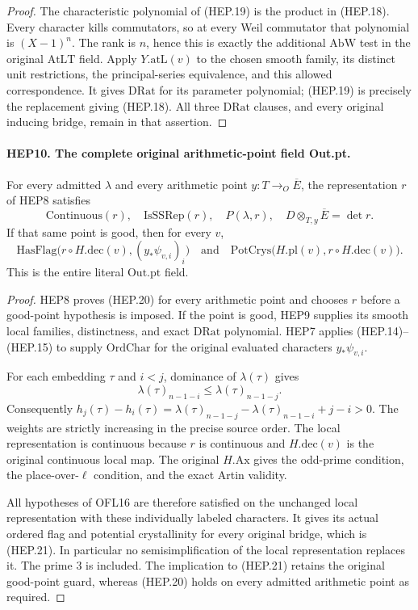 \begin{proof}
The characteristic polynomial of (HEP.19) is the product in
(HEP.18).  Every character kills commutators, so at every Weil
commutator that polynomial is $(X-1)^n$.  The rank is $n$,
hence this is exactly the additional $\mathrm{AbW}$ test in
the original $\mathrm{AtLT}$ field.  Apply $Y.\mathrm{atL}(v)$
to the chosen smooth family, its distinct unit restrictions,
the principal-series equivalence, and this allowed correspondence.
It gives $\mathrm{DRat}$ for its parameter polynomial; (HEP.19)
is precisely the replacement giving (HEP.18).  All three
$\mathrm{DRat}$ clauses, and every original inducing bridge,
remain in that assertion.
\end{proof}

\paragraph{HEP10. The complete original arithmetic-point field Out.pt.}
\label{claim:HEP10}
For every admitted $\lambda$ and every arithmetic point
$y:T\to_O\overline E$, the representation $r$ of HEP8 satisfies
\[
 \mathrm{Continuous}(r),\quad \mathrm{IsSSRep}(r),\quad
 P(\lambda,r),\quad D\otimes_{T,y}\overline E=\det r.
 \tag{HEP.20}
\]
If that same point is good, then for every $v$,
\[
 \mathrm{HasFlag}\bigl(r\circ H.\mathrm{dec}(v),
                                  (y_*\psi_{v,i})_i\bigr)
       \quad\text{and}\quad
 \mathrm{PotCrys}\bigl(H.\mathrm{pl}(v),r\circ H.\mathrm{dec}(v)\bigr).
 \tag{HEP.21}
\]
This is the entire literal $\mathrm{Out.pt}$ field.
\begin{proof}
HEP8 proves (HEP.20) for every arithmetic point and chooses $r$
before a good-point hypothesis is imposed.  If the point is good,
HEP9 supplies its smooth local families, distinctness, and exact
$\mathrm{DRat}$ polynomial.  HEP7 applies (HEP.14)--(HEP.15)
to supply $\mathrm{OrdChar}$ for the original evaluated characters
$y_*\psi_{v,i}$.

For each embedding $\tau$ and $i<j$, dominance of $\lambda(\tau)$
gives
\[
 \lambda(\tau)_{n-1-i}\leq\lambda(\tau)_{n-1-j}.
\]
Consequently
$h_j(\tau)-h_i(\tau)
 =\lambda(\tau)_{n-1-j}-\lambda(\tau)_{n-1-i}+j-i>0$.
The weights are strictly increasing in the precise source order.
The local representation is continuous because $r$ is continuous
and $H.\mathrm{dec}(v)$ is the original continuous local map.
The original $H.\mathrm{Ax}$ gives the odd-prime condition,
the place-over-$\ell$ condition, and the exact Artin validity.

All hypotheses of OFL16 are therefore satisfied on the unchanged
local representation with these individually labeled characters.
It gives its actual ordered flag and potential crystallinity for
every original bridge, which is (HEP.21).  In particular no
semisimplification of the local representation replaces it.
The prime $3$ is included.  The implication to (HEP.21) retains
the original good-point guard, whereas (HEP.20) holds on every
admitted arithmetic point as required.
\end{proof}

